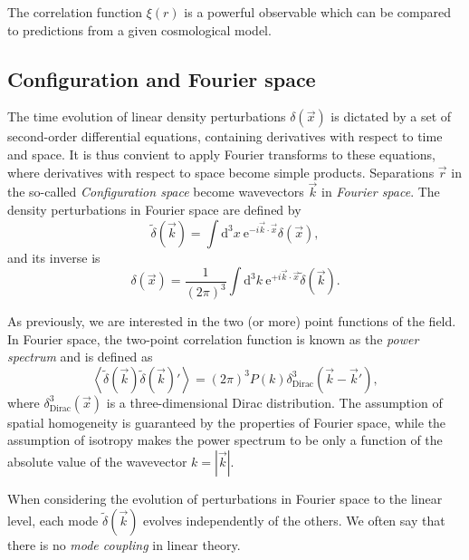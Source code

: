     The correlation function $\xi(r)$ is a powerful observable which can 
    be compared to predictions from a given cosmological model. 

    
    \subsection{Configuration and Fourier space}

    The time evolution of linear density perturbations $\delta(\vec{x})$ 
    is dictated by a set of second-order differential equations, containing 
    derivatives with respect to time and space. 
    It is thus convient to apply Fourier
    transforms to these equations, where derivatives with respect to space 
    become simple products. Separations $\vec{r}$ in the so-called 
    \emph{Configuration space} become wavevectors $\vec{k}$ in 
    \emph{Fourier space}. The density perturbations in Fourier space are
    defined by 
    \begin{equation}
        \tilde{\delta}(\vec{k}) = \int \mathrm{d}^3x \ \mathrm{e}^{- i \vec{k}\cdot\vec{x}} \delta(\vec{x}),
    \end{equation}
    and its inverse is
    \begin{equation}
        \delta(\vec{x}) = \frac{1}{(2\pi)^3}\int \mathrm{d}^3k \ \mathrm{e}^{+i \vec{k}\cdot\vec{x}} \tilde\delta(\vec{k}).
    \end{equation}

    As previously, we are interested in the two (or more) point functions of the
    field. In Fourier space, the two-point correlation function is known as the
    \emph{power spectrum} and is defined as
    \begin{equation}
        \left\langle \tilde\delta(\vec{k}) \tilde\delta(\vec{k})' \right\rangle = (2\pi)^3 P(k) \delta^3_\mathrm{Dirac}(\vec{k}-\vec{k}'),
        \label{eq:power_spectrum_definition}
    \end{equation}
    where $\delta^3_\mathrm{Dirac}(\vec{x})$ is a three-dimensional Dirac distribution.
    The assumption of spatial homogeneity is guaranteed by the properties of Fourier space,
    while the assumption of isotropy makes the power spectrum to be only a function of the
    absolute value of the wavevector $k = |\vec{k}|$. 

    When considering the evolution of perturbations in Fourier space to the linear level,
    each mode $\tilde\delta(\vec{k})$ evolves independently of the others. We often say 
    that there is no \emph{mode coupling} in linear theory. 

